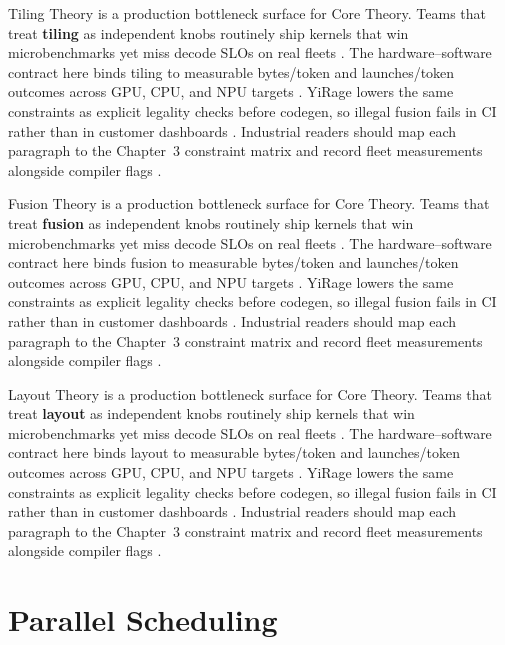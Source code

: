 Tiling Theory is a production bottleneck surface for Core Theory. Teams that treat \textbf{tiling} as independent knobs routinely ship kernels that win microbenchmarks yet miss decode SLOs on real fleets \citep{patel2025llminference,nvidia2022hopper}. The hardware--software contract here binds tiling to measurable bytes/token and launches/token outcomes across GPU, CPU, and NPU targets \citep{taxbreak2026,semianalysis2024tma}. YiRage lowers the same constraints as explicit legality checks before codegen, so illegal fusion fails in CI rather than in customer dashboards \citep{memoryfloor2026,amd2024xdna}. Industrial readers should map each paragraph to the Chapter~3 constraint matrix and record fleet measurements alongside compiler flags \citep{nvidia2022hopper,amd2024aie}.

Fusion Theory is a production bottleneck surface for Core Theory. Teams that treat \textbf{fusion} as independent knobs routinely ship kernels that win microbenchmarks yet miss decode SLOs on real fleets \citep{taxbreak2026,semianalysis2024tma}. The hardware--software contract here binds fusion to measurable bytes/token and launches/token outcomes across GPU, CPU, and NPU targets \citep{memoryfloor2026,amd2024xdna}. YiRage lowers the same constraints as explicit legality checks before codegen, so illegal fusion fails in CI rather than in customer dashboards \citep{nvidia2022hopper,amd2024aie}. Industrial readers should map each paragraph to the Chapter~3 constraint matrix and record fleet measurements alongside compiler flags \citep{semianalysis2024tma,dlbook}.

Layout Theory is a production bottleneck surface for Core Theory. Teams that treat \textbf{layout} as independent knobs routinely ship kernels that win microbenchmarks yet miss decode SLOs on real fleets \citep{memoryfloor2026,amd2024xdna}. The hardware--software contract here binds layout to measurable bytes/token and launches/token outcomes across GPU, CPU, and NPU targets \citep{nvidia2022hopper,amd2024aie}. YiRage lowers the same constraints as explicit legality checks before codegen, so illegal fusion fails in CI rather than in customer dashboards \citep{semianalysis2024tma,dlbook}. Industrial readers should map each paragraph to the Chapter~3 constraint matrix and record fleet measurements alongside compiler flags \citep{amd2024xdna,dao2022flashattention}.

\section{Parallel Scheduling}
\label{sec:parallel_scheduling}

